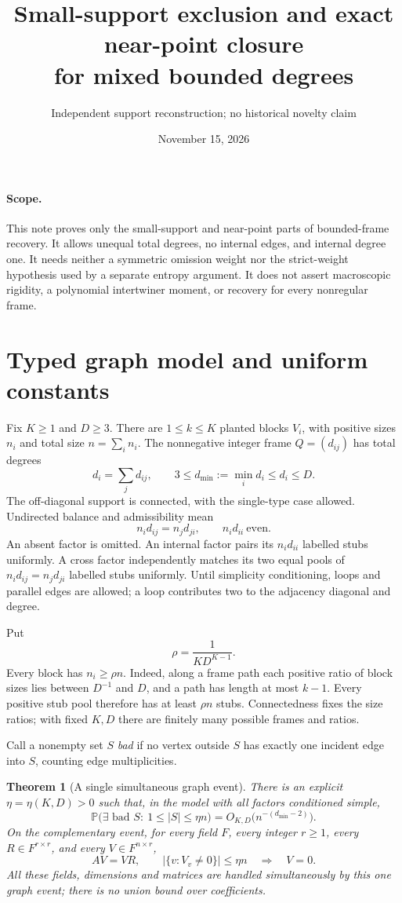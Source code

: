 \documentclass[11pt]{article}
\title{Small-support exclusion and exact near-point closure\\for mixed bounded degrees}
\author{Independent support reconstruction; no historical novelty claim}
\date{November 15, 2026}
\newtheorem{theorem}{Theorem}
\newcommand{\Prob}{\mathbb P}
\begin{document}
\maketitle

\paragraph{Scope.}
This note proves only the small-support and near-point parts of
bounded-frame recovery. It allows unequal total degrees, no internal
edges, and internal degree one. It needs neither a symmetric omission
weight nor the strict-weight hypothesis used by a separate entropy
argument. It does not assert macroscopic rigidity, a polynomial
intertwiner moment, or recovery for every nonregular frame.

\section{Typed graph model and uniform constants}
Fix $K\ge1$ and $D\ge3$. There are $1\le k\le K$ planted blocks
$V_i$, with positive sizes $n_i$ and total size $n=\sum_i n_i$.
The nonnegative integer frame $Q=(d_{ij})$ has total degrees
\[
 d_i=\sum_jd_{ij},\qquad 3\le d_{\min}:=\min_i d_i\le d_i\le D.
\]
The off-diagonal support is connected, with the single-type case
allowed. Undirected balance and admissibility mean
\[
 n_i d_{ij}=n_jd_{ji},\qquad n_i d_{ii}\ \text{even}.
\]
An absent factor is omitted. An internal factor pairs its $n_id_{ii}$
labelled stubs uniformly. A cross factor independently matches its
two equal pools of $n_id_{ij}=n_jd_{ji}$ labelled stubs uniformly.
Until simplicity conditioning, loops and parallel edges are allowed;
a loop contributes two to the adjacency diagonal and degree.

Put
\[
 \rho=\frac1{K D^{K-1}}.
\]
Every block has $n_i\ge\rho n$. Indeed, along a frame path each
positive ratio of block sizes lies between $D^{-1}$ and $D$, and a
path has length at most $k-1$. Every positive stub pool therefore
has at least $\rho n$ stubs. Connectedness fixes the size ratios;
with fixed $K,D$ there are finitely many possible frames and ratios.

Call a nonempty set $S$ \emph{bad} if no vertex outside $S$ has
exactly one incident edge into $S$, counting edge multiplicities.

\begin{theorem}[A single simultaneous graph event]\label{thm:small}
There is an explicit $\eta=\eta(K,D)>0$ such that, in the model with
all factors conditioned simple,
\[
 \Prob\bigl(\exists\text{ bad }S:\ 1\le|S|\le\eta n\bigr)
 =O_{K,D}\bigl(n^{-(d_{\min}-2)}\bigr).
\]
On the complementary event, for every field $F$, every integer
$r\ge1$, every $R\in F^{r\times r}$, and every $V\in F^{n\times r}$,
\[
 AV=VR,\qquad |\{v:V_v\ne0\}|\le\eta n
 \quad\Longrightarrow\quad V=0.
\]
All these fields, dimensions and matrices are handled simultaneously
by this one graph event; there is no union bound over coefficients.
\end{theorem}
\end{document}
